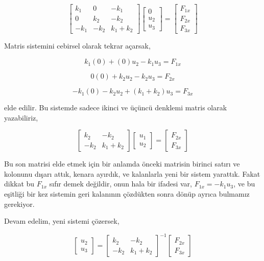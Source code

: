 \documentclass[12pt,fleqn]{article}\usepackage{../../common}
\begin{document}
$$
\left[\begin{array}{ccc}
k_1 & 0 & -k_1 \\
0 & k_2 & -k_2 \\
-k_1 & -k_2 & k_1+k_2
\end{array}\right]
\left[\begin{array}{c}
0 \\ u_2 \\ u_3
\end{array}\right] =
\left[\begin{array}{c}
F_{1x} \\ F_{2x} \\ F_{3x}
\end{array}\right]
$$

Matris sistemini cebirsel olarak tekrar açarsak,

$$
k_1(0) + (0) u_2 - k_1 u_3 = F_{1x}
$$

$$
0(0) + k_2 u_2 - k_2 u_3 = F_{2x}
$$

$$
-k_1 (0) - k_2 u_2 + (k_1+k_2) u_3 = F_{3x}
$$

elde edilir. Bu sistemde sadece ikinci ve üçüncü denklemi matris olarak
yazabiliriz,

$$
\left[\begin{array}{cc}
k_2 & -k_2 \\ -k_2 & k_1 + k_2 
\end{array}\right]
\left[\begin{array}{c}
u_1 \\ u_2
\end{array}\right] =
\left[\begin{array}{c}
F_{2x} \\ F_{3x}
\end{array}\right]
$$

Bu son matrisi elde etmek için bir anlamda önceki matrisin birinci satırı ve
kolonunu dışarı attık, kenara ayırdık, ve kalanlarla yeni bir sistem yarattık.
Fakat dikkat bu $F_{1x}$ sıfır demek değildir, onun hala bir ifadesi var,
$F_{1x} = -k_1 u_3$, ve bu eşitliği bir kez sistemin geri kalanının çözdükten
sonra dönüp ayrıca bulmamız gerekiyor.

Devam edelim, yeni sistemi çözersek,

$$
\left[\begin{array}{ccc}
u_2 \\ u_3
\end{array}\right] =
\left[\begin{array}{cc}
k_2 & -k_2 \\ -k_2 & k_1 + k_2 
\end{array}\right]^{-1}
\left[\begin{array}{c}
F_{2x} \\ F_{3x}
\end{array}\right]
$$
\end{document}
